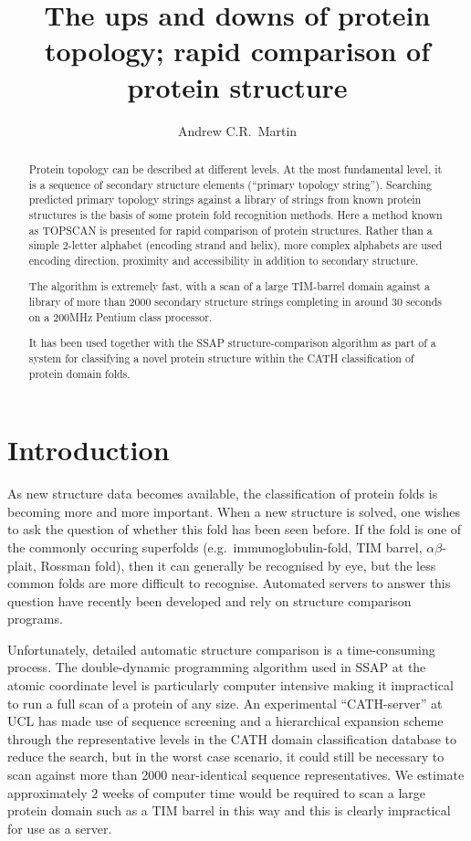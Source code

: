 \documentclass{article}
\title{The ups and downs of protein topology; rapid comparison of protein
structure}
\author{Andrew C.R.\ Martin}
\begin{document}
\maketitle

\begin{abstract}
Protein topology can be described at different levels. At the most
fundamental level, it is a sequence of secondary structure
elements (``primary topology string''). Searching predicted
primary topology strings against a library of strings from known
protein structures is the basis of some protein fold recognition methods.
Here a method known as TOPSCAN is presented for rapid comparison of
protein structures. Rather than a simple 2-letter alphabet (encoding
strand and helix), more complex alphabets are used encoding direction,
proximity and accessibility in addition to secondary structure.

The algorithm is extremely fast, with a scan of a large TIM-barrel
domain against a library of more than 2000 secondary structure strings
completing in around 30 seconds on a 200MHz Pentium class processor.

It has been used together with the SSAP structure-comparison algorithm
as part of a system for classifying a novel protein structure within
the CATH classification of protein domain folds.

\end{abstract}

\section{Introduction}
As new structure data becomes available, the classification of protein
folds is becoming more and more important. When a new structure is
solved, one wishes to ask the question of whether this fold has been
seen before. If the fold is one of the commonly occuring superfolds
(e.g.\ immunoglobulin-fold, TIM barrel, $\alpha\beta$-plait, Rossman
fold), then it can generally be recognised by eye, but the less common
folds are more difficult to recognise. Automated servers to answer
this question have recently been developed and rely on structure
comparison programs.

Unfortunately, detailed automatic structure comparison is a
time-consuming process. The double-dynamic programming algorithm used
in SSAP at the atomic coordinate level is particularly computer
intensive making it impractical to run a full scan of a protein of any
size.  An experimental ``CATH-server'' at UCL has made use of sequence
screening and a hierarchical expansion scheme through the
representative levels in the CATH domain classification database to
reduce the search, but in the worst case scenario, it could still be
necessary to scan against more than 2000 near-identical sequence
representatives. We estimate approximately 2 weeks of computer time
would be required to scan a large protein domain such as a TIM barrel
in this way and this is clearly impractical for use as a server.
\end{document}
